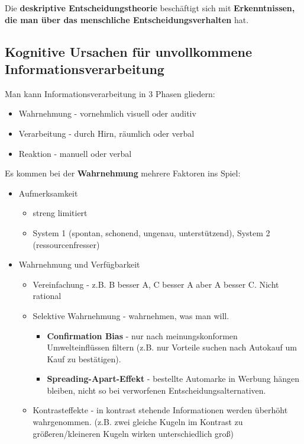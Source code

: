 Die \textbf{deskriptive Entscheidungstheorie} beschäftigt sich mit
\textbf{Erkenntnissen, die man über das menschliche Entscheidungsverhalten} hat.

\subsection{Kognitive Ursachen für unvollkommene Informationsverarbeitung}
Man kann Informationsverarbeitung in 3 Phasen gliedern:
\begin{itemize}
    \item Wahrnehmung - vornehmlich visuell oder auditiv

    \item Verarbeitung - durch Hirn, räumlich oder verbal
    \item Reaktion - manuell oder verbal
\end{itemize}
Es kommen bei der \textbf{Wahrnehmung} mehrere Faktoren ins Spiel:
\begin{itemize}
    \item Aufmerksamkeit
    \begin{itemize}
        \item streng limitiert
        \item System 1 (spontan, schonend, ungenau, unterstützend),
            System 2 (ressourcenfresser)
    \end{itemize}
    \item Wahrnehmung und Verfügbarkeit
    \begin{itemize}
        \item Vereinfachung - z.B. B besser A, C besser A aber A besser C.
            Nicht rational
        \item Selektive Wahrnehmung - wahrnehmen, was man will.
        \begin{itemize}
            \item \textbf{Confirmation Bias} - nur nach meinungskonformen
            Umwelteinflüssen filtern (z.B. nur Vorteile suchen nach Autokauf
            um Kauf zu bestätigen).
            \item \textbf{Spreading-Apart-Effekt} - bestellte Automarke
            in Werbung hängen bleiben, nicht so bei verworfenen
            Entscheidungsalternativen.
        \end{itemize}
        \item Kontrasteffekte - in kontrast stehende Informationen werden
            überhöht wahrgenommen. (z.B. zwei gleiche Kugeln im Kontrast
            zu größeren/kleineren Kugeln wirken unterschiedlich groß)
    \end{itemize}
\end{itemize}
